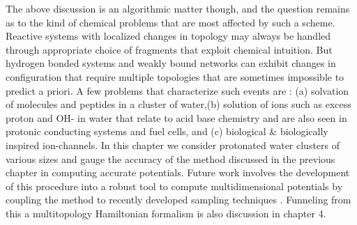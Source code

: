 The above discussion is an algorithmic matter though, and the question remains as to the
 kind of chemical problems that are most affected by such a scheme. Reactive systems with
localized changes in topology may always be handled through appropriate choice of fragments
that exploit chemical intuition. But hydrogen bonded systems and weakly bound networks can
exhibit changes in configuration that require multiple topologies that are sometimes
impossible to predict a priori. A few problems that characterize such events are :
(a) solvation of molecules and peptides in a cluster of water,(b) solution of ions such
as excess proton and OH- in water that relate to acid base chemistry and are also seen in
protonic conducting systems and fuel cells, and (c) biological & biologically inspired
ion-channels. In this chapter we consider protonated water clusters of various sizes and
gauge the accuracy of the method discussed in the previous chapter in computing accurate
potentials. Future work involves the development of this procedure into a robust tool to
compute multidimensional potentials by coupling the method to recently developed sampling
techniques \cite{sumner2007quantum, jakowski2006computational, li2014vibrational,
hocker2011shannon, shannonIsoprene}. Funneling from this a multitopology Hamiltonian
formalism is also discussion in chapter 4.


